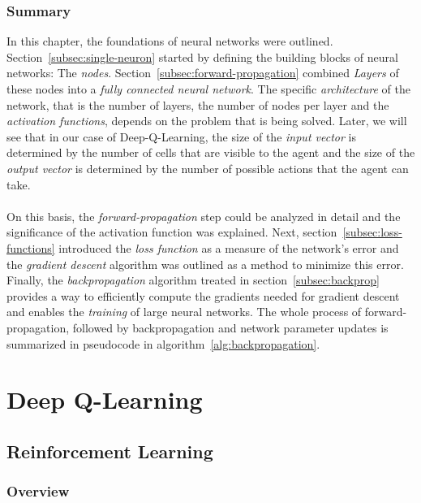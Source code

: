 \subsection{Summary}
\label{subsec:nn-summary}
In this chapter, the foundations of neural networks were outlined.
Section~\ref{subsec:single-neuron} started by defining the building blocks of neural networks: The \textit{nodes}.
Section~\ref{subsec:forward-propagation} combined \textit{Layers} of these nodes into a \textit{fully connected neural network}.
The specific \textit{architecture} of the network, that is the number of layers, the number of nodes per layer and the \textit{activation functions}, depends on the problem that is being solved.
Later, we will see that in our case of Deep-Q-Learning, the size of the \textit{input vector} is determined by the number of cells that are visible to the agent and the size of the \textit{output vector} is determined by the number of possible actions that the agent can take.
\\
\\
On this basis, the \textit{forward-propagation} step could be analyzed in detail and the significance of the activation function was explained.
Next, section~\ref{subsec:loss-functions} introduced the \textit{loss function} as a measure of the network's error and the \textit{gradient descent} algorithm was outlined as a method to minimize this error.
Finally, the \textit{backpropagation} algorithm treated in section~\ref{subsec:backprop} provides a way to efficiently compute the gradients needed for gradient descent and enables the \textit{training} of large neural networks.
The whole process of forward-propagation, followed by backpropagation and network parameter updates is summarized in pseudocode in algorithm~\ref{alg:backpropagation}.





\chapter{Deep Q-Learning}
\label{ch:dql}


\section{Reinforcement Learning}

\subsection{Overview}

